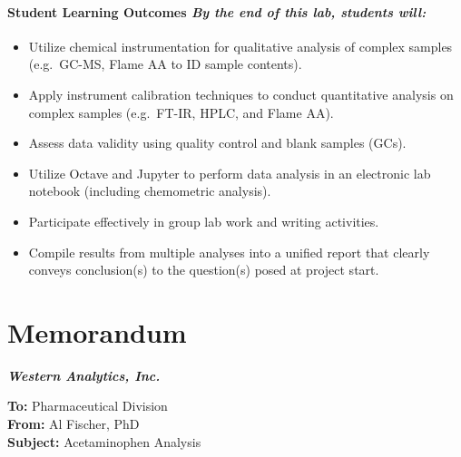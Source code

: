 \documentclass[]{tufte-book}
\providecommand{\tightlist}{%
  \setlength{\itemsep}{0pt}\setlength{\parskip}{0pt}}
\begin{document}
\hypertarget{student-learning-outcomes-by-the-end-of-this-lab-students-will-4}{%
\paragraph{\texorpdfstring{\textbf{Student Learning Outcomes} \textbar{} \emph{By the end of this lab, students will:}}{Student Learning Outcomes \textbar{} By the end of this lab, students will:}}\label{student-learning-outcomes-by-the-end-of-this-lab-students-will-4}}

\begin{itemize}
\tightlist
\item
  Utilize chemical instrumentation for qualitative analysis of complex samples (e.g.~GC-MS, Flame AA to ID sample contents).\\
\item
  Apply instrument calibration techniques to conduct quantitative analysis on complex samples (e.g.~FT-IR, HPLC, and Flame AA).\\
\item
  Assess data validity using quality control and blank samples (GCs).\\
\item
  Utilize Octave and Jupyter to perform data analysis in an electronic lab notebook (including chemometric analysis).\\
\item
  Participate effectively in group lab work and writing activities.\\
\item
  Compile results from multiple analyses into a unified report that clearly conveys conclusion(s) to the question(s) posed at project start.
\end{itemize}

\newpage

\hypertarget{memorandum-1}{%
\section*{Memorandum}\label{memorandum-1}}

\noindent
\textbf{\emph{Western Analytics, Inc.}}

\noindent  
\textbf{To:} Pharmaceutical Division\\
\noindent  
\textbf{From:} Al Fischer, PhD\\
\noindent  
\textbf{Subject:} Acetaminophen Analysis
\end{document}
